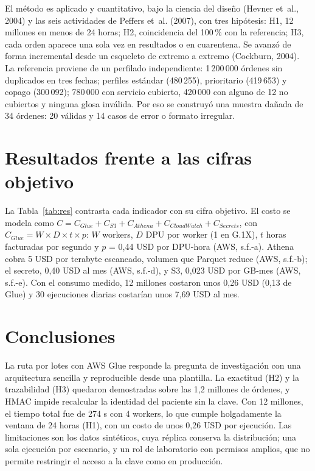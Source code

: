 \documentclass[10pt,twocolumn,letterpaper]{article}
\begin{document}
El método es aplicado y cuantitativo, bajo la ciencia del diseño (Hevner et~al., 2004) y las seis actividades de Peffers et~al. (2007), con tres hipótesis: H1, 12 millones en menos de 24 horas; H2, coincidencia del 100\,\% con la referencia; H3, cada orden aparece una sola vez en resultados o en cuarentena. Se avanzó de forma incremental desde un esqueleto de extremo a extremo (Cockburn, 2004). La referencia proviene de un perfilado independiente: 1\,200\,000 órdenes sin duplicados en tres fechas; perfiles estándar (480\,255), prioritario (419\,653) y copago (300\,092); 780\,000 con servicio cubierto, 420\,000 con alguno de 12 no cubiertos y ninguna glosa inválida. Por eso se construyó una muestra dañada de 34 órdenes: 20 válidas y 14 casos de error o formato irregular.

\section{Resultados frente a las cifras objetivo}
La Tabla~\ref{tab:res} contrasta cada indicador con su cifra objetivo. El costo se modela como \(C = C_{\mathit{Glue}} + C_{\mathit{S3}} + C_{\mathit{Athena}} + C_{\mathit{CloudWatch}} + C_{\mathit{Secrets}}\), con \(C_{\mathit{Glue}} = W \times D \times t \times p\): \(W\) workers, \(D\) DPU por worker (1 en G.1X), \(t\) horas facturadas por segundo y \(p\) = 0,44 USD por DPU-hora (AWS, s.f.-a). Athena cobra 5 USD por terabyte escaneado, volumen que Parquet reduce (AWS, s.f.-b); el secreto, 0,40 USD al mes (AWS, s.f.-d), y S3, 0,023 USD por GB-mes (AWS, s.f.-e). Con el consumo medido, 12 millones costaron unos 0,26 USD (0,13 de Glue) y 30 ejecuciones diarias costarían unos 7,69 USD al mes.

\section{Conclusiones}
La ruta por lotes con AWS Glue responde la pregunta de investigación con una arquitectura sencilla y reproducible desde una plantilla. La exactitud (H2) y la trazabilidad (H3) quedaron demostradas sobre las 1,2 millones de órdenes, y HMAC impide recalcular la identidad del paciente sin la clave. Con 12 millones, el tiempo total fue de 274 s con 4 workers, lo que cumple holgadamente la ventana de 24 horas (H1), con un costo de unos 0,26 USD por ejecución. Las limitaciones son los datos sintéticos, cuya réplica conserva la distribución; una sola ejecución por escenario, y un rol de laboratorio con permisos amplios, que no permite restringir el acceso a la clave como en producción.
\end{document}
